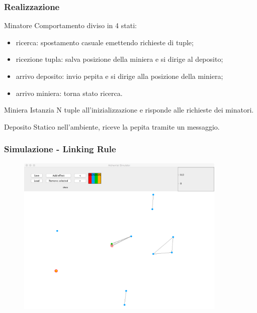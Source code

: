 \documentclass[handout]{beamer}\mode<presentation>{\usetheme{AMSCesenaBleu}}
\begin{document}
\begin{frame}
\frametitle{Realizzazione}
\begin{block}{Minatore}
Comportamento diviso in 4 stati:
\begin{itemize}
\item \alert{ricerca}: spostamento casuale emettendo richieste di tuple;
\item \alert{ricezione tupla}: salva posizione della miniera e si dirige al deposito;
\item \alert{arrivo deposito}: invio pepita e si dirige alla posizione della miniera;
\item \alert{arrivo miniera}: torna stato ricerca. 
\end{itemize}
\end{block}
\begin{block}{Miniera}
Istanzia N tuple all'inizializzazione e risponde alle richieste dei minatori.
\end{block}
\begin{block}{Deposito}
Statico nell'ambiente, riceve la pepita tramite un messaggio.
\end{block}
\end{frame}


\begin{frame}
\frametitle{Simulazione - Linking Rule}
\vspace*{-0.25cm}
\begin{figure}
\includegraphics[width=10cm]{images/simul_link.png}
\end{figure}
\end{frame}
\end{document}
